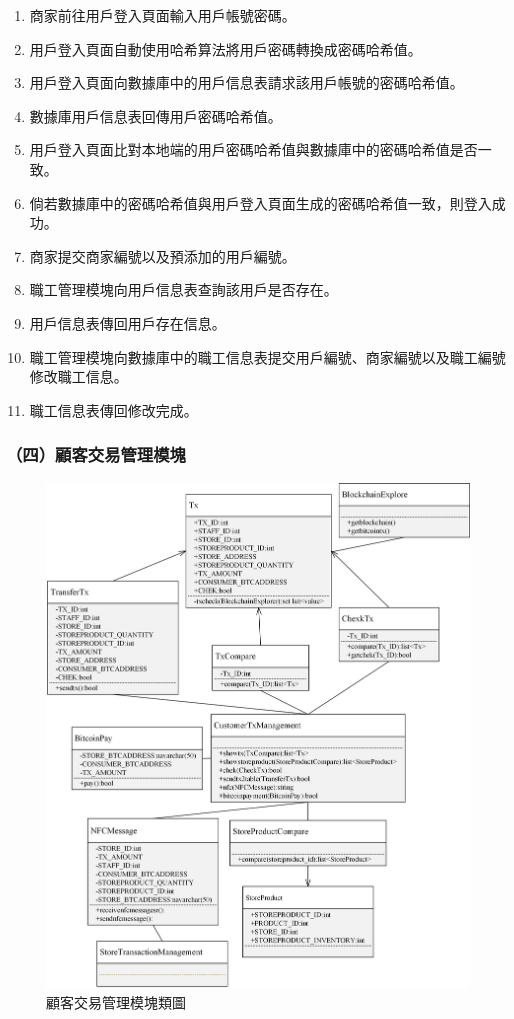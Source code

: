 	\begin{enumerate}
	\item 商家前往用戶登入頁面輸入用戶帳號密碼。
	\item 用戶登入頁面自動使用哈希算法將用戶密碼轉換成密碼哈希值。
	\item 用戶登入頁面向數據庫中的用戶信息表請求該用戶帳號的密碼哈希值。
	\item 數據庫用戶信息表回傳用戶密碼哈希值。
	\item 用戶登入頁面比對本地端的用戶密碼哈希值與數據庫中的密碼哈希值是否一致。
	\item 倘若數據庫中的密碼哈希值與用戶登入頁面生成的密碼哈希值一致，則登入成功。
	\item 商家提交商家編號以及預添加的用戶編號。
	\item 職工管理模塊向用戶信息表查詢該用戶是否存在。
	\item 用戶信息表傳回用戶存在信息。
	\item 職工管理模塊向數據庫中的職工信息表提交用戶編號、商家編號以及職工編號修改職工信息。
	\item 職工信息表傳回修改完成。
	\end{enumerate}


\subsubsection{（四）顧客交易管理模塊}

	\begin{figure}[htbp]
		\centering
		\includegraphics[width = 1\textwidth]{c4.jpg}
		\caption{顧客交易管理模塊類圖}\label{c4}
	\end{figure}

